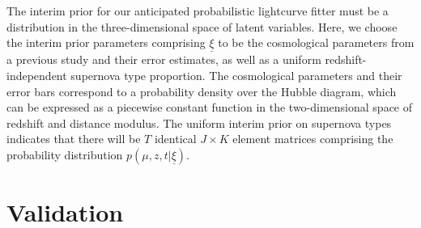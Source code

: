 \documentclass[12pt, onecolumn]{emulateapj}
\newcommand{\textul}{\underline}
\begin{document}
The interim prior for our anticipated probabilistic lightcurve fitter must be a distribution in the three-dimensional space of latent variables.  Here, we choose the interim prior parameters comprising $\textul{\xi}$ to be the cosmological parameters from a previous study and their error estimates, as well as a uniform redshift-independent supernova type proportion.  The cosmological parameters and their error bars correspond to a probability density over the Hubble diagram, which can be expressed as a piecewise constant function in the two-dimensional space of redshift and distance modulus.  The uniform interim prior on supernova types indicates that there will be $T$ identical $J\times K$ element matrices comprising the probability distribution $p(\mu, z, t | \textul{\xi})$.

%
%
%



\section{Validation}
\end{document}
